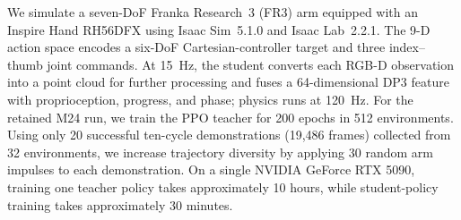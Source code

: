 We simulate a seven-DoF Franka Research~3 (FR3) arm equipped with an Inspire
Hand RH56DFX using Isaac Sim~5.1.0 and Isaac Lab~2.2.1. The 9-D action space
encodes a six-DoF Cartesian-controller target and three index--thumb joint
commands. At
\SI{15}{Hz},
the student converts each RGB-D observation into a point cloud for further
processing and fuses a 64-dimensional DP3 feature with proprioception, progress,
and phase; physics runs at \SI{120}{Hz}. For the retained M24 run, we train the
PPO teacher for 200 epochs in 512 environments. Using only 20 successful
ten-cycle demonstrations (19,486 frames) collected from 32 environments, we
increase trajectory diversity by applying 30 random arm impulses to each
demonstration. On a single NVIDIA GeForce RTX 5090, training one teacher policy
takes approximately 10 hours, while student-policy training takes approximately
30 minutes.


